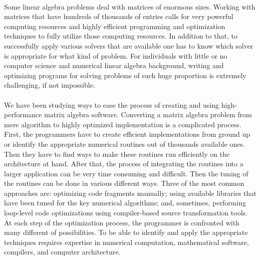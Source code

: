 \paragraph{} 
Some linear algebra problems deal with matrices of enormous sizes. Working with matrices that have hundreds of thousands of entries calls for very powerful computing resources and highly efficient programming and optimization techniques to fully utilize those computing resources. In addition to that, to successfully apply various solvers that are available one has to know which solver is appropriate for what kind of problem. For individuals with little or no computer science and numerical linear algebra background, writing and optimizing programs for solving problems of such huge proportion is extremely challenging, if not impossible. 

\paragraph{}
We have been studying ways to ease the process of creating and using high-performance matrix algebra software. Converting a matrix algebra problem from mere algorithm to highly optimized implementation is a complicated process. First, the programmers have to create efficient implementations from ground up or identify the appropriate numerical routines out of thousands available ones. Then they have to find ways to make these routines run efficiently on the architecture at hand. After that, the process of integrating the routines into a larger application can be very time consuming and difficult. Then the tuning of the routines can be done in various different ways. Three of the most common approaches are: optimizing code fragments manually; using available libraries that have been tuned  for the key numerical algorithms; and, sometimes, performing loop-level code optimizations using compiler-based source transformation tools. At each step of the optimization process, the programmer is confronted with many different of possibilities. To be able to identify and apply the appropriate techniques requires expertise in numerical computation, mathematical software, compilers, and computer architecture.

